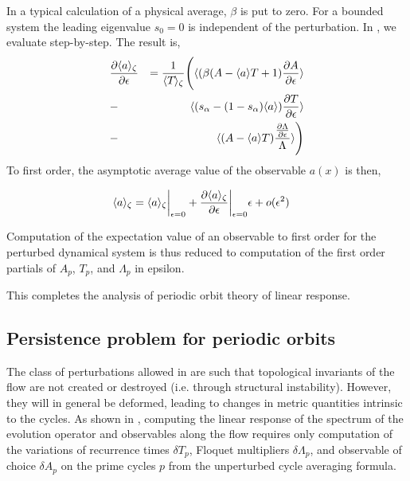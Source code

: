 \documentclass[aps,pre,
                showpacs,
                twocolumn,
                groupedaddress,
                superscriptaddress,
                floatfix]{revtex4-1}
\begin{document}
In a typical calculation of a physical average, $\beta$ is put to zero.
For a bounded system the leading eigenvalue $s_{0}=0$ is independent of
the perturbation. In , we evaluate
 step-by-step. The result is,
\begin{eqnarray*}
&\frac{\partial \langle {a} \rangle_{\zeta}}{\partial \epsilon}
& = \frac{1}{\langle {{\ensuremath{T_{}}}} \rangle_{\zeta}}
        \Bigg(
    \langle {(\beta(A-\langle {a} \rangle T + 1)\frac{\partial A}{\partial\epsilon}} \rangle \\
&-& \langle {(s_{\alpha}-(1-s_{\alpha})\langle {a} \rangle)\frac{\partial T}{\partial\epsilon}} \rangle  \\
&-& \langle {(A-\langle {a} \rangle T) \frac{\frac{\partial\Lambda}{\partial\epsilon}}{\Lambda}} \rangle
        \Bigg)
\end{eqnarray*}
To first order, the asymptotic average value of the observable $a(x)$ is then,

\begin{eqnarray*}
& \langle {a} \rangle_{\zeta} = \langle {a} \rangle_{\zeta} \bigg\rvert_{\epsilon = 0} + \frac{\partial \langle {a} \rangle_{\zeta}}{\partial \epsilon} \bigg\rvert_{\epsilon = 0} \epsilon + o(\epsilon^{2})
\end{eqnarray*}

Computation of the expectation value of an observable to first order for the perturbed dynamical system  is thus reduced to computation of the first order partials of $A_{p}$, $T_{p}$, and $\Lambda_{p}$ in epsilon. 

This completes the analysis of periodic orbit theory of linear response.

\subsection{Persistence problem for periodic orbits}
The class of perturbations allowed in  are such that topological invariants of the flow are not created or destroyed (i.e. through structural instability). However, they will in general be deformed, leading to changes in metric quantities intrinsic to the cycles. As shown in , computing the linear response of the spectrum of the evolution operator and observables along the flow requires only computation of the variations of recurrence times $\delta T_{p}$, Floquet multipliers $\delta \Lambda_{p}$, and observable of choice $\delta A_{p}$ on the prime cycles $p$ from the unperturbed cycle averaging formula. 
\end{document}
